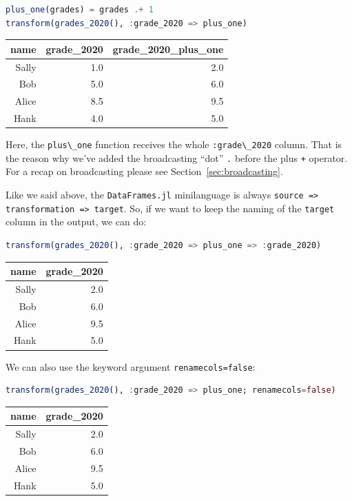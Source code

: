 \documentclass[
  notoc %
]{tufte-book}
\newcommand{\passthrough}[1]{#1}
\begin{document}
\begin{lstlisting}[language=Julia]
plus_one(grades) = grades .+ 1
transform(grades_2020(), :grade_2020 => plus_one)
\end{lstlisting}

\begin{longtable}[]{@{}rrr@{}}
\toprule
name & grade\_2020 & grade\_2020\_plus\_one \\
\midrule
\endhead
Sally & 1.0 & 2.0 \\
Bob & 5.0 & 6.0 \\
Alice & 8.5 & 9.5 \\
Hank & 4.0 & 5.0 \\
\bottomrule
\end{longtable}

Here, the \passthrough{\lstinline!plus\_one!} function receives the
whole \passthrough{\lstinline!:grade\_2020!} column. That is the reason
why we've added the broadcasting ``dot'' \passthrough{\lstinline!.!}
before the plus \passthrough{\lstinline!+!} operator. For a recap on
broadcasting please see Section~\ref{sec:broadcasting}.

Like we said above, the \passthrough{\lstinline!DataFrames.jl!}
minilanguage is always
\passthrough{\lstinline!source => transformation => target!}. So, if we
want to keep the naming of the \passthrough{\lstinline!target!} column
in the output, we can do:

\begin{lstlisting}[language=Julia]
transform(grades_2020(), :grade_2020 => plus_one => :grade_2020)
\end{lstlisting}

\begin{longtable}[]{@{}rr@{}}
\toprule
name & grade\_2020 \\
\midrule
\endhead
Sally & 2.0 \\
Bob & 6.0 \\
Alice & 9.5 \\
Hank & 5.0 \\
\bottomrule
\end{longtable}

We can also use the keyword argument
\passthrough{\lstinline!renamecols=false!}:

\begin{lstlisting}[language=Julia]
transform(grades_2020(), :grade_2020 => plus_one; renamecols=false)
\end{lstlisting}

\begin{longtable}[]{@{}rr@{}}
\toprule
name & grade\_2020 \\
\midrule
\endhead
Sally & 2.0 \\
Bob & 6.0 \\
Alice & 9.5 \\
Hank & 5.0 \\
\bottomrule
\end{longtable}
\end{document}
